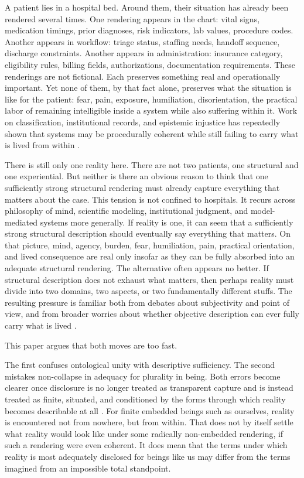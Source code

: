 \documentclass[11pt]{article}
\begin{document}
A patient lies in a hospital bed. Around them, their situation has already been rendered several times. One rendering appears in the chart: vital signs, medication timings, prior diagnoses, risk indicators, lab values, procedure codes. Another appears in workflow: triage status, staffing needs, handoff sequence, discharge constraints. Another appears in administration: insurance category, eligibility rules, billing fields, authorizations, documentation requirements. These renderings are not fictional. Each preserves something real and operationally important. Yet none of them, by that fact alone, preserves what the situation is like for the patient: fear, pain, exposure, humiliation, disorientation, the practical labor of remaining intelligible inside a system while also suffering within it. Work on classification, institutional records, and epistemic injustice has repeatedly shown that systems may be procedurally coherent while still failing to carry what is lived from within \cite{BowkerStar1999,Fricker2007}.

There is still only one reality here. There are not two patients, one structural and one experiential. But neither is there an obvious reason to think that one sufficiently strong structural rendering must already capture everything that matters about the case. This tension is not confined to hospitals. It recurs across philosophy of mind, scientific modeling, institutional judgment, and model-mediated systems more generally. If reality is one, it can seem that a sufficiently strong structural description should eventually say everything that matters. On that picture, mind, agency, burden, fear, humiliation, pain, practical orientation, and lived consequence are real only insofar as they can be fully absorbed into an adequate structural rendering. The alternative often appears no better. If structural description does not exhaust what matters, then perhaps reality must divide into two domains, two aspects, or two fundamentally different stuffs. The resulting pressure is familiar both from debates about subjectivity and point of view, and from broader worries about whether objective description can ever fully carry what is lived \cite{Nagel1974,Nagel1986,Levine1983,Chalmers1995}.

This paper argues that both moves are too fast.

The first confuses ontological unity with descriptive sufficiency. The second mistakes non-collapse in adequacy for plurality in being. Both errors become clearer once disclosure is no longer treated as transparent capture and is instead treated as finite, situated, and conditioned by the forms through which reality becomes describable at all \cite{Haraway1988,Polanyi1958,Nagel1986}. For finite embedded beings such as ourselves, reality is encountered not from nowhere, but from within. That does not by itself settle what reality would look like under some radically non-embedded rendering, if such a rendering were even coherent. It does mean that the terms under which reality is most adequately disclosed for beings like us may differ from the terms imagined from an impossible total standpoint.
\end{document}
